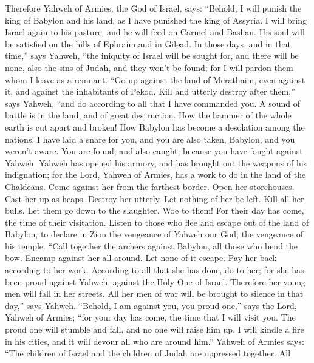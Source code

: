  Therefore Yahweh of Armies, the God of Israel, says:
``Behold, I will punish the king of Babylon and his land, as I have
punished the king of Assyria.  I will bring Israel again
to his pasture, and he will feed on Carmel and Bashan. His soul will be
satisfied on the hills of Ephraim and in Gilead.  In
those days, and in that time,'' says Yahweh, ``the iniquity of Israel
will be sought for, and there will be none, also the sins of Judah, and
they won't be found; for I will pardon them whom I leave as a remnant.
 ``Go up against the land of Merathaim, even against it,
and against the inhabitants of Pekod. Kill and utterly destroy after
them,'' says Yahweh, ``and do according to all that I have commanded
you.  A sound of battle is in the land, and of great
destruction.  How the hammer of the whole earth is cut
apart and broken! How Babylon has become a desolation among the nations!
 I have laid a snare for you, and you are also taken,
Babylon, and you weren't aware. You are found, and also caught, because
you have fought against Yahweh.  Yahweh has opened his
armory, and has brought out the weapons of his indignation; for the
Lord, Yahweh of Armies, has a work to do in the land of the Chaldeans.
 Come against her from the farthest border. Open her
storehouses. Cast her up as heaps. Destroy her utterly. Let nothing of
her be left.  Kill all her bulls. Let them go down to the
slaughter. Woe to them! For their day has come, the time of their
visitation.  Listen to those who flee and escape out of
the land of Babylon, to declare in Zion the vengeance of Yahweh our God,
the vengeance of his temple.  ``Call together the archers
against Babylon, all those who bend the bow. Encamp against her all
around. Let none of it escape. Pay her back according to her work.
According to all that she has done, do to her; for she has been proud
against Yahweh, against the Holy One of Israel. 
Therefore her young men will fall in her streets. All her men of war
will be brought to silence in that day,'' says Yahweh. 
``Behold, I am against you, you proud one,'' says the Lord, Yahweh of
Armies; ``for your day has come, the time that I will visit you.
 The proud one will stumble and fall, and no one will
raise him up. I will kindle a fire in his cities, and it will devour all
who are around him.''  Yahweh of Armies says: ``The
children of Israel and the children of Judah are oppressed together. All
